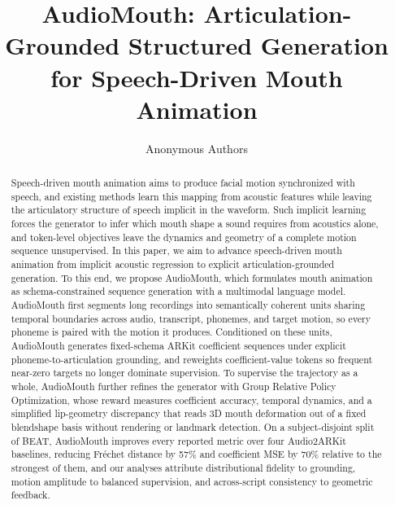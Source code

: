 \documentclass{article} %
\title{AudioMouth: Articulation-Grounded Structured Generation\\ for Speech-Driven Mouth Animation}
\author{Anonymous Authors}
\begin{document}
\maketitle

\begin{abstract}
Speech-driven mouth animation aims to produce facial motion synchronized with speech, and existing methods learn this mapping from acoustic features while leaving the articulatory structure of speech implicit in the waveform. Such implicit learning forces the generator to infer which mouth shape a sound requires from acoustics alone, and token-level objectives leave the dynamics and geometry of a complete motion sequence unsupervised. In this paper, we aim to advance speech-driven mouth animation from implicit acoustic regression to explicit articulation-grounded generation. To this end, we propose AudioMouth, which formulates mouth animation as schema-constrained sequence generation with a multimodal language model. AudioMouth first segments long recordings into semantically coherent units sharing temporal boundaries across audio, transcript, phonemes, and target motion, so every phoneme is paired with the motion it produces. Conditioned on these units, AudioMouth generates fixed-schema ARKit coefficient sequences under explicit phoneme-to-articulation grounding, and reweights coefficient-value tokens so frequent near-zero targets no longer dominate supervision. To supervise the trajectory as a whole, AudioMouth further refines the generator with Group Relative Policy Optimization, whose reward measures coefficient accuracy, temporal dynamics, and a simplified lip-geometry discrepancy that reads 3D mouth deformation out of a fixed blendshape basis without rendering or landmark detection. On a subject-disjoint split of BEAT, AudioMouth improves every reported metric over four Audio2ARKit baselines, reducing Fr\'echet distance by 57\% and coefficient MSE by 70\% relative to the strongest of them, and our analyses attribute distributional fidelity to grounding, motion amplitude to balanced supervision, and across-script consistency to geometric feedback.
\end{abstract}








\newpage


\newpage



\newpage
\appendix

\end{document}
